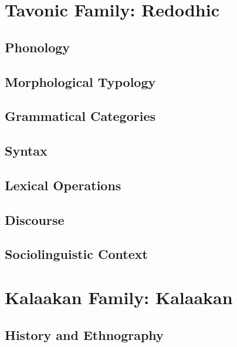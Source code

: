 \documentclass[12pt,letterpaper,openany,twoside]{memoir}
\let\originalpart=\part
\def\part{\cleardoublepage\originalpart}
\begin{document}
\part{Tavonic Family: Redodhic}



\chapter{Phonology}

\chapter{Morphological Typology}

\chapter{Grammatical Categories}

\chapter{Syntax}

\chapter{Lexical Operations}

\chapter{Discourse}

\chapter{Sociolinguistic Context}

\part{Kalaakan Family: Kalaakan}

\chapter{History and Ethnography}
\end{document}
